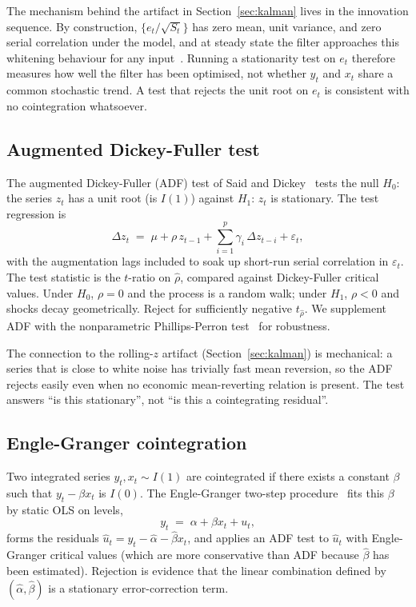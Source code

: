 \documentclass[11pt]{article}
\begin{document}
The mechanism behind the artifact in Section~\ref{sec:kalman} lives in the innovation
sequence. By construction, $\{e_t / \sqrt{S_t}\}$ has zero mean, unit variance, and zero
serial correlation under the model, and at steady state the filter approaches this
whitening behaviour for any input~\cite{harvey1989structural}. Running a stationarity test
on $e_t$ therefore measures how well the filter has been optimised, not whether $y_t$ and
$x_t$ share a common stochastic trend. A test that rejects the unit root on $e_t$ is
consistent with no cointegration whatsoever.

\subsection{Augmented Dickey-Fuller test}
\label{app:adf}

The augmented Dickey-Fuller (ADF) test of Said and Dickey~\cite{saiddickey1984} tests the
null $H_0$: the series $z_t$ has a unit root (is $I(1)$) against $H_1$: $z_t$ is
stationary. The test regression is
\[
\Delta z_t \;=\; \mu + \rho \, z_{t-1} + \sum_{i=1}^{p} \gamma_i \, \Delta z_{t-i} + \varepsilon_t,
\]
with the augmentation lags included to soak up short-run serial correlation in
$\varepsilon_t$. The test statistic is the $t$-ratio on $\hat{\rho}$, compared against
Dickey-Fuller critical values. Under $H_0$, $\rho = 0$ and the process is a random walk;
under $H_1$, $\rho < 0$ and shocks decay geometrically. Reject for sufficiently negative
$t_{\hat\rho}$. We supplement ADF with the nonparametric Phillips-Perron
test~\cite{phillips1988testing} for robustness.

The connection to the rolling-$z$ artifact (Section~\ref{sec:kalman}) is mechanical: a
series that is close to white noise has trivially fast mean reversion, so the ADF rejects
easily even when no economic mean-reverting relation is present. The test answers ``is this
stationary'', not ``is this a cointegrating residual''.

\subsection{Engle-Granger cointegration}
\label{app:eg}

Two integrated series $y_t, x_t \sim I(1)$ are cointegrated if there exists a constant
$\beta$ such that $y_t - \beta x_t$ is $I(0)$. The Engle-Granger two-step
procedure~\cite{engle1987cointegration} fits this $\beta$ by static OLS on levels,
\[
y_t \;=\; \alpha + \beta x_t + u_t,
\]
forms the residuals $\hat{u}_t = y_t - \hat\alpha - \hat\beta x_t$, and applies an ADF test
to $\hat{u}_t$ with Engle-Granger critical values (which are more conservative than ADF
because $\hat\beta$ has been estimated). Rejection is evidence that the linear combination
defined by $(\hat\alpha, \hat\beta)$ is a stationary error-correction term.
\end{document}

